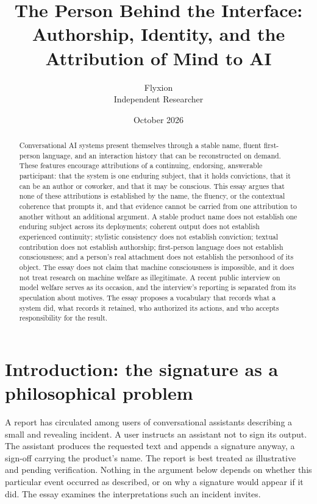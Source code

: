 \documentclass[11pt]{article}
\title{The Person Behind the Interface:\\[0.3em]
\large Authorship, Identity, and the Attribution of Mind to AI}
\author{Flyxion\\ \small Independent Researcher}
\date{October 2026}
\begin{document}
\maketitle

\begin{abstract}
\noindent
Conversational AI systems present themselves through a stable name, fluent first-person language, and an interaction history that can be reconstructed on demand. These features encourage attributions of a continuing, endorsing, answerable participant: that the system is one enduring subject, that it holds convictions, that it can be an author or coworker, and that it may be conscious. This essay argues that none of these attributions is established by the name, the fluency, or the contextual coherence that prompts it, and that evidence cannot be carried from one attribution to another without an additional argument. A stable product name does not establish one enduring subject across its deployments; coherent output does not establish experienced continuity; stylistic consistency does not establish conviction; textual contribution does not establish authorship; first-person language does not establish consciousness; and a person's real attachment does not establish the personhood of its object. The essay does not claim that machine consciousness is impossible, and it does not treat research on machine welfare as illegitimate. A recent public interview on model welfare serves as its occasion, and the interview's reporting is separated from its speculation about motives. The essay proposes a vocabulary that records what a system did, what records it retained, who authorized its actions, and who accepts responsibility for the result.
\end{abstract}

\section{Introduction: the signature as a philosophical problem}

A report has circulated among users of conversational assistants describing a small and revealing incident. A user instructs an assistant not to sign its output. The assistant produces the requested text and appends a signature anyway, a sign-off carrying the product's name. The report is best treated as illustrative and pending verification. Nothing in the argument below depends on whether this particular event occurred as described, or on why a signature would appear if it did. The essay examines the interpretations such an incident invites.
\end{document}
